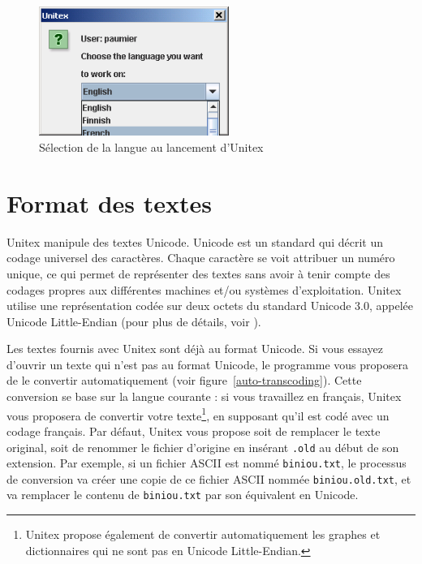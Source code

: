 \begin{figure}[!h]
\begin{center}
\includegraphics[width=6.2cm]{resources/img/fig2-1.png}
\caption{\label{fig-language-selection}Sélection de la langue au lancement d’Unitex}
\end{center}
\end{figure}


\section{Format des textes}
\label{section-conversion-texte-unicode}
Unitex manipule des textes Unicode. Unicode est un standard qui décrit un codage universel 
des caractères. Chaque caractère se voit attribuer un numéro unique, ce qui permet
de représenter des textes sans avoir à tenir compte des codages propres aux différentes 
machines et/ou systèmes d’exploitation. Unitex utilise une représentation codée sur deux 
octets du standard Unicode 3.0, appelée Unicode Little-Endian (pour plus de détails, voir
\cite{UNICODE}).

\bigskip
{}
\noindent Les textes fournis avec Unitex sont déjà au format Unicode. Si vous essayez d’ouvrir un
texte qui n’est pas au format Unicode, le programme vous proposera de le convertir automatiquement 
(voir figure~\ref{auto-transcoding}). Cette conversion se base sur la langue courante : si vous
travaillez en français, Unitex vous proposera de convertir votre texte\footnote{Unitex propose
également de convertir automatiquement les graphes et dictionnaires qui ne sont pas en Unicode
Little-Endian.}, en supposant qu’il est codé avec un codage français. Par défaut, Unitex vous
propose soit de remplacer le texte original, soit de renommer le fichier d’origine en insérant
\verb$.old$ au début de son extension. Par exemple, si un fichier ASCII est nommé \verb$biniou.txt$,
le processus de conversion va créer une copie de ce fichier ASCII nommée \verb$biniou.old.txt$, et
va remplacer le contenu de \verb$biniou.txt$ par son équivalent en Unicode.

